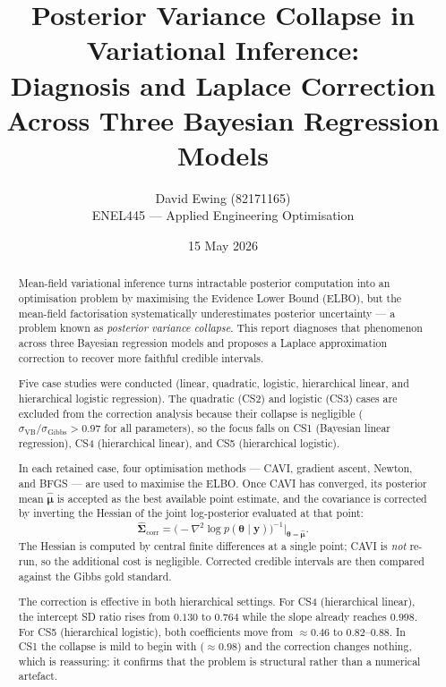 \documentclass[11pt,a4paper]{article}
\title{
Posterior Variance Collapse in Variational Inference:\\
Diagnosis and Laplace Correction Across Three Bayesian Regression Models
}
\author{
  David Ewing (82171165)\\
  ENEL445 --- Applied Engineering Optimisation
}
\date{15 May 2026}
\begin{document}
\maketitle

\begin{abstract}
\setlength{\parindent}{0pt}
\setlength{\parskip}{0.7em}

Mean-field variational inference turns intractable posterior computation into an
optimisation problem by maximising the Evidence Lower Bound (ELBO), but the
mean-field factorisation systematically underestimates posterior uncertainty ---
a problem known as \emph{posterior variance collapse}.
This report diagnoses that phenomenon across three Bayesian regression models and
proposes a Laplace approximation correction to recover more faithful credible intervals.

Five case studies were conducted (linear, quadratic, logistic, hierarchical linear,
and hierarchical logistic regression).
The quadratic (CS2) and logistic (CS3) cases are excluded from the correction
analysis because their collapse is negligible
($\sigma_{\mathrm{VB}}/\sigma_{\mathrm{Gibbs}} > 0.97$ for all parameters), so the
focus falls on CS1 (Bayesian linear regression),
CS4 (hierarchical linear), and CS5 (hierarchical logistic).

In each retained case, four optimisation methods --- CAVI, gradient ascent, Newton,
and BFGS --- are used to maximise the ELBO.
Once CAVI has converged, its posterior mean $\hat{\bm{\mu}}$ is accepted as the best
available point estimate, and the covariance is corrected by inverting the Hessian
of the joint log-posterior evaluated at that point:
\begin{equation*}
  \hat{\bm{\Sigma}}_{\mathrm{corr}}
  = \bigl(-\nabla^2 \log p(\bm{\theta}\mid\bm{y})\bigr)^{-1}\!\Big|_{\bm{\theta}=\hat{\bm{\mu}}}.
\end{equation*}
The Hessian is computed by central finite differences at a single point; CAVI is
\emph{not} re-run, so the additional cost is negligible.
Corrected credible intervals are then compared against the Gibbs gold standard.

The correction is effective in both hierarchical settings.
For CS4 (hierarchical linear), the intercept SD ratio rises from $0.130$ to $0.764$
while the slope already reaches $0.998$.
For CS5 (hierarchical logistic), both coefficients move from $\approx 0.46$ to
$0.82$--$0.88$.
In CS1 the collapse is mild to begin with ($\approx 0.98$) and the correction changes
nothing, which is reassuring: it confirms that the problem is structural rather than
a numerical artefact.
\end{abstract}
\end{document}
